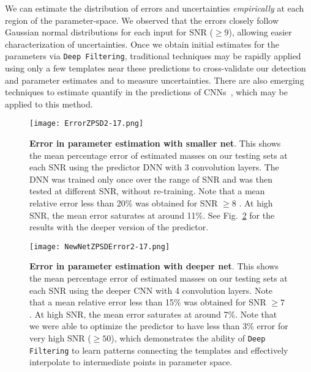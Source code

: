 \documentclass[aps,prd,%
amsmath,floats,floatfix, twocolumn, superscriptaddress,nofootinbib,showpacs]{revtex4-1}
\begin{document}
We can estimate the distribution of errors and uncertainties \textit{empirically} at each region of the parameter-space. We observed that the errors closely follow Gaussian normal distributions for each input for SNR ($\ge 9$), allowing easier characterization of uncertainties. Once we obtain initial estimates for the parameters via \texttt{Deep Filtering}, traditional techniques may be rapidly applied using only a few templates near these predictions to cross-validate our detection and parameter estimates and to measure uncertainties. There are also emerging techniques to estimate quantify in the predictions of CNNs~\cite{images:2017}, which may be applied to this method.

\begin{figure}

	\hspace{-.2in}	\texttt{[image: ErrorZPSD2-17.png]}\hspace{1.7em}

	\caption{\textbf{Error in parameter estimation with smaller net}. This shows the mean percentage error of estimated masses on our testing sets at each SNR using the predictor DNN with 3 convolution layers. The DNN was trained only once over the range of SNR and was then tested at different SNR, without re-training. Note that a mean relative error less than 20\% was obtained for SNR $\ge8$ . At high SNR, the mean error saturates at around 11\%. See Fig.~\ref{fig:ErrPredict2} for the results with the deeper version of the predictor.
}
	\label{fig:ErrPredict}
\end{figure}

\begin{figure}
	
	\hspace{-.2in}	\texttt{[image: NewNetZPSDError2-17.png]}
	
	\caption{\textbf{Error in parameter estimation with deeper net}. This shows the mean percentage error of estimated masses on our testing sets at each SNR using the deeper CNN with 4 convolution layers. Note that a mean relative error less than 15\% was obtained for SNR $\ge 7$ . At high SNR, the mean error saturates at around 7\%. Note that we were able to optimize the predictor to have less than 3\% error for very high SNR ($\ge50$), which demonstrates the ability of \texttt{Deep Filtering} to learn patterns connecting the templates and effectively interpolate to intermediate points in parameter space.
	}
	\label{fig:ErrPredict2}
\end{figure}
\end{document}
